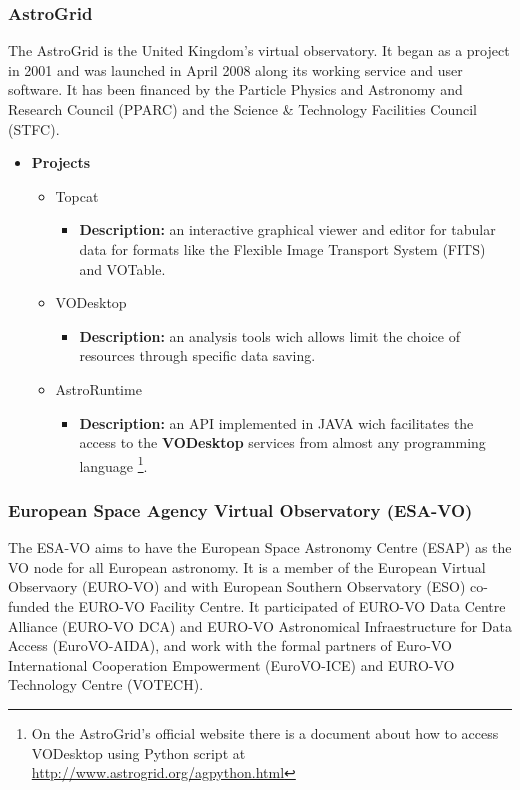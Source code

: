 \subsubsection{AstroGrid}
The AstroGrid \cite{website:astrogrid-home} is the United Kingdom's virtual
observatory. It began as a project in 2001 and was launched in April 2008 along
its working service and user software. It has been financed by the Particle
Physics and Astronomy and Research Council (PPARC) and the Science \& Technology
Facilities Council (STFC).

\begin{itemize}
\item \textbf{Projects}
\begin{itemize}
\item Topcat
\begin{itemize}
\item \textbf{Description:} an interactive graphical viewer and editor for
tabular data for formats like the Flexible Image Transport System (FITS) and
VOTable.
\end{itemize}
\item VODesktop
\begin{itemize}
\item \textbf{Description:} an analysis tools wich allows limit the choice of
resources through specific data saving.
\end{itemize}
\item AstroRuntime
\begin{itemize}
\item \textbf{Description:} an API implemented in JAVA wich facilitates the
access to the \textbf{VODesktop} services from almost any programming language
\footnote{On the AstroGrid's official website there is a document about how to
access VODesktop using Python script at
\url{http://www.astrogrid.org/agpython.html}}.
\end{itemize}
\end{itemize}
\end{itemize}

\subsubsection{European Space Agency Virtual Observatory (ESA-VO)}
The ESA-VO \cite{website:esa-vo-home} aims to have the European Space Astronomy
Centre (ESAP) as the VO node for all European astronomy. It is a member of the
European Virtual Observaory (EURO-VO) and with European Southern Observatory
(ESO) co-funded the EURO-VO Facility Centre. It participated of EURO-VO Data
Centre Alliance (EURO-VO DCA) and EURO-VO Astronomical Infraestructure for Data
Access (EuroVO-AIDA), and work with the formal partners of Euro-VO International
Cooperation Empowerment (EuroVO-ICE) and EURO-VO Technology Centre (VOTECH).

